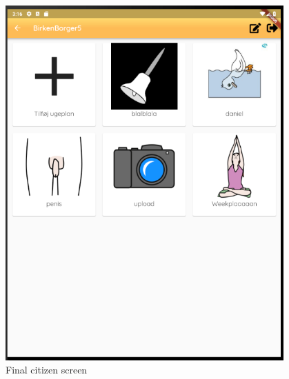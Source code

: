 \begin{figure}[H]
    \begin{center}
        \includegraphics[width=0.95\textwidth]{figures/FinalScreen/chooseWeekplanScreen.png}
    \end{center}
    \caption{Final citizen screen}
    \label{fig:finalCelectWeekplan}
\end{figure}

